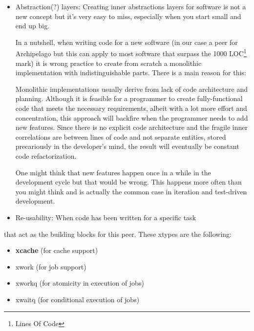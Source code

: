 \begin{itemize}
	\item Abstraction(?) layers: Creating inner abstractions layers for 
		software is not a new concept but it's very easy to miss, 
		especially when you start small and end up big.
		
		In a nutshell, when writing code for a new software (in our case 
		a peer for Archipelago but this can apply to most software that 
		surpass the 1000 LOC\footnote[1]
		{Lines Of Code}
		mark) it is wrong practice to create from scratch a monolithic 
		implementation with indistinguishable parts. There is a main 
		reason for this:
		
		Monolithic implementations usually derive from lack of code 
		architecture and planning. Although it is feasible for a 
		programmer to create fully-functional code that meets the 
		necessary requirements, albeit with a lot more effort and 
		concentration, this approach will backfire when the programmer 
		needs to add new features. Since there is no explicit code 
		architecture and the fragile inner correlations are between 
		lines of code and not separate entities, stored precariously in 
		the developer's mind, the result will eventually be constant 
		code refactorization.
		
		One might think that new features happen once in a while in the 
		development cycle but that would be wrong.  This happens more 
		often than you might think and is actually the common case in 
		iteration and test-driven development.
	\item Re-usability: When code has been written for a specific task
\end{itemize}	

that act as the building blocks for this peer. These xtypes are the following:

\begin{comment}
More specifically, cached consists of the cache provided by xcache aasfs as safa
asfasfnd a
pre-allocated number of objects. An object is divided in buckets and its size,
as well as bucket size, are defined by the user.

The fact that objects are pre-allocated means two things:

1) We don't need to care about memory fragmentation and system call overhead
2) We cannot index single buckets. <FILLME>
\end{comment}

\begin{itemize}
	\item \textbf{xcache} (for cache support)
	\item xwork (for job support)
	\item xworkq (for atomicity in execution of jobs)
	\item xwaitq (for conditional execution of jobs)
\end{itemize}

